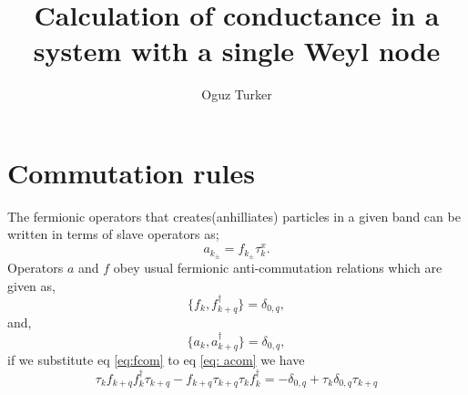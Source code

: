 \documentclass[]{article}
\title{Calculation of conductance in a system with a single Weyl node}
\author{Oguz Turker}
\begin{document}
\maketitle

\begin{abstract}

\end{abstract}

\section{Commutation rules}
The fermionic operators that creates(anhilliates) particles in a given band can be written in terms of slave operators as;
\begin{equation}
a_{k_{\pm}}=f_{k_{\pm}}\tau_k^x.
\end{equation}
Operators $a$ and $f$ obey usual fermionic anti-commutation relations which are given as,
 \begin{equation}
\{f_k,f^\dagger_{k+q}\}=\delta_{0,q}, \label{eq:fcom}
 \end{equation} 
 and,
 \begin{equation}
 \{a_k,a^\dagger_{k+q}\}=\delta_{0,q}\label{eq: acom},
  \end{equation} 
  if we substitute eq \ref{eq:fcom} to eq \ref{eq: acom} we have 
  \begin{equation}
  \tau_{k}f_{k+q}f^\dagger_{k}\tau_{k+q}-f_{k+q}\tau_{k+q}  \tau_{k}f^\dagger_{k}=-\delta_{0,q}+\tau_k\delta_{0,q}\tau_{k+q}
   \end{equation} 
\end{document}
